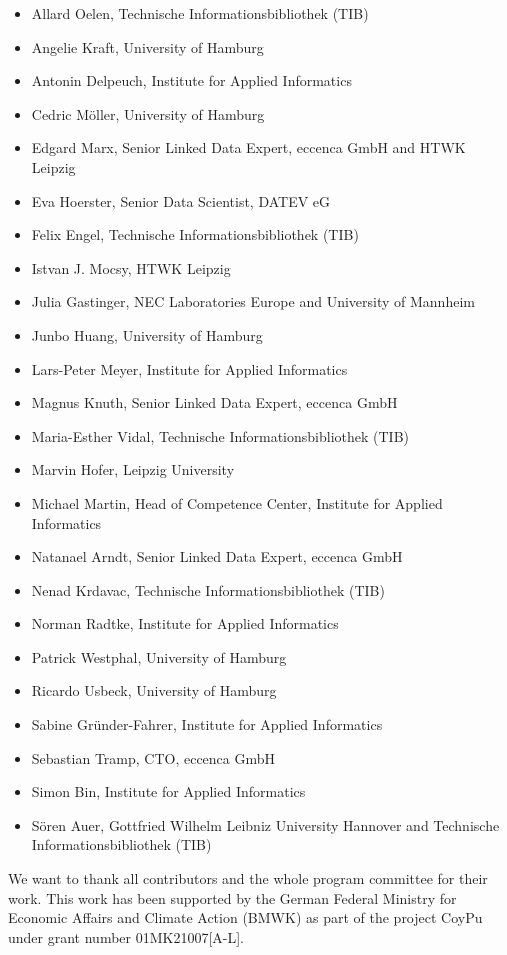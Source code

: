 \documentclass{ceurart}
\begin{document}
\begin{itemize}
    \item Allard Oelen, Technische Informationsbibliothek (TIB)
    \item Angelie Kraft, University of Hamburg
    \item Antonin Delpeuch, Institute for Applied Informatics
    \item Cedric Möller, University of Hamburg
    \item Edgard Marx, Senior Linked Data Expert, eccenca GmbH and HTWK Leipzig
    \item Eva Hoerster, Senior Data Scientist, DATEV eG
    \item Felix Engel, Technische Informationsbibliothek (TIB)
    \item Istvan J. Mocsy, HTWK Leipzig
    \item Julia Gastinger, NEC Laboratories Europe and University of Mannheim
    \item Junbo Huang, University of Hamburg
    \item Lars-Peter Meyer,  Institute for Applied Informatics
    \item Magnus Knuth, Senior Linked Data Expert, eccenca GmbH
    \item Maria-Esther Vidal, Technische Informationsbibliothek (TIB)
    \item Marvin Hofer, Leipzig University
    \item Michael Martin, Head of Competence Center, Institute for Applied Informatics
    \item Natanael Arndt, Senior Linked Data Expert, eccenca GmbH
    \item Nenad Krdavac, Technische Informationsbibliothek (TIB)
    \item Norman Radtke, Institute for Applied Informatics
    \item Patrick Westphal, University of Hamburg
    \item Ricardo Usbeck, University of Hamburg
    \item Sabine Gründer-Fahrer, Institute for Applied Informatics
    \item Sebastian Tramp, CTO, eccenca GmbH
    \item Simon Bin, Institute for Applied Informatics
    \item Sören Auer, Gottfried Wilhelm Leibniz University Hannover and Technische Informationsbibliothek (TIB)
\end{itemize}


\begin{acknowledgments}
We want to thank all contributors and the whole program committee for their work.
This work has been supported by the German Federal Ministry for Economic Affairs and Climate Action (BMWK) as part of the project CoyPu under grant number 01MK21007[A-L].
\end{acknowledgments}


%

\end{document}
